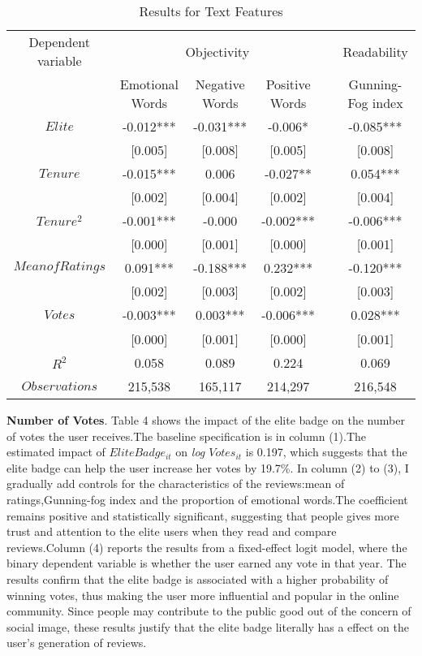 \documentclass[12pt]{article}%
\newcommand{\ra}[1]{\renewcommand{\arraystretch}{#1}}
\begin{document}
\begin{table*}[htbp]\centering
\ra{1.3}
\renewcommand\thetable{5}
  \caption{Results for Text Features  \label{PrePoIr} } 
\begin{tabular}{@{}cccccc@{}}

\toprule[1.5pt]
Dependent variable & \multicolumn{3}{c}{Objectivity} & \phantom{abc}& \multicolumn{1}{c}{Readability} \\ 
\cmidrule{2-4} \cmidrule{6-6} 
& Emotional Words & Negative Words & Positive Words && Gunning-Fog index  \\ \midrule
$Elite$ & -0.012*** & -0.031*** & -0.006* && -0.085***  \\
	 & [0.005]& [0.008]& [0.005]&& [0.008]\\
$Tenure$ &-0.015*** & 0.006& -0.027**&& 0.054***\\
	 & [0.002]& [0.004]& [0.002]&& [0.004]\\
$Tenure^2$ & -0.001***& -0.000 &-0.002*** && -0.006***\\
	 & [0.000]& [0.001]& [0.000]&& [0.001]\\
$Mean of Ratings$ &0.091*** &-0.188*** & 0.232*** &&-0.120*** \\
	&[0.002] &[0.003] & [0.002] && [0.003]\\
$Votes$ &-0.003*** &0.003*** & -0.006*** &&0.028***\\
	&[0.000]　&[0.001] &[0.000] &&[0.001]\\
$R^2$ &0.058 &0.089 &0.224 &&0.069\\
$Observations$ &215,538 &165,117 &214,297 &&216,548\\
\bottomrule
\end{tabular}

\end{table*}


\textbf{Number of Votes}. Table 4 shows the impact of the elite badge on the number of votes the user receives.The baseline specification is in column (1).The estimated impact of \emph{$EliteBadge_{it}$} on \emph{log $Votes_{it}$} is 0.197, which suggests that the elite badge can help the user increase her votes by 19.7\%. In column (2) to (3), I gradually add controls for the characteristics of the reviews:mean of ratings,Gunning-fog index and the proportion of emotional words.The coefficient remains positive and statistically significant, suggesting that people gives more trust and attention to the elite users when they read and compare reviews.Column (4) reports the results from a fixed-effect logit model, where the binary dependent variable is whether the user earned any vote in that year. The results confirm that the elite badge is associated with a higher probability of winning votes, thus making the user more influential and popular in the online community. Since people may contribute to the public good out of the concern of social image, these results justify that the elite badge literally has a effect on the user's generation of reviews.
\end{document}
